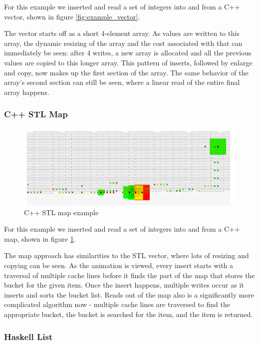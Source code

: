 \documentclass[annual]{acmsiggraph}
\begin{document}
  For this example we inserted and read a set of integers into and from a C++ vector, shown in figure \ref{fig:example_vector}.
  
  The vector starts off as a short 4-element array. As values are written to this array, the dynamic resizing of the array and the cost associated with that can immediately be seen: after 4 writes, a new array is allocated and all the previous values are copied to this longer array. This pattern of inserts, followed by enlarge and copy, now makes up the first section of the array. The same behavior of the array's second section can still be seen, where a linear read of the entire final array happens.

  \subsubsection{C++ STL Map}
  
  \begin{figure}[t]
		\centering
    \includegraphics[scale=0.45]{images/example_map.png}
		\caption{C++ STL map example}
    \label{fig:example_map}
	\end{figure}

  For this example we inserted and read a set of integers into and from a C++ map, shown in figure \ref{fig:example_map}.
  
  The map approach has similarities to the STL vector, where lots of resizing and copying can be seen. As the animation is viewed, every insert starts with a traversal of multiple cache lines before it finds the part of the map that stores the bucket for the given item. Once the insert happens, multiple writes occur as it inserts and sorts the bucket list. 
  Reads out of the map also is a significantly more complicated algorithm now - multiple cache lines are traversed to find the appropriate bucket, the bucket is searched for the item, and the item is returned.

  \subsubsection{Haskell List}
  
\end{document}
